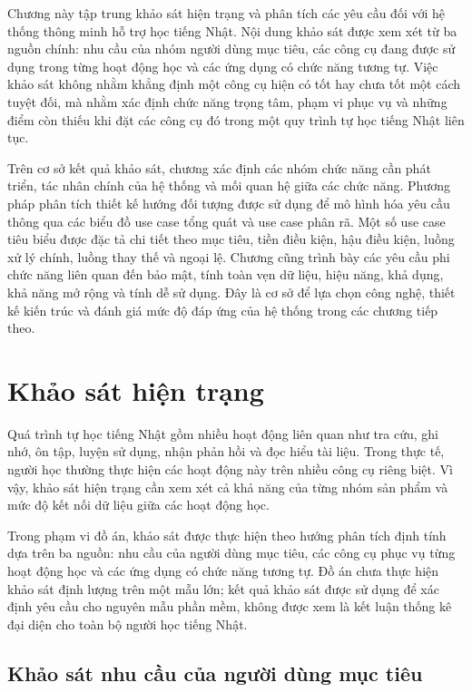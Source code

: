 \documentclass[../DoAn.tex]{subfiles}
\begin{document}
Chương này tập trung khảo sát hiện trạng và phân tích các yêu cầu đối với hệ thống thông minh hỗ trợ học tiếng Nhật. Nội dung khảo sát được xem xét từ ba nguồn chính: nhu cầu của nhóm người dùng mục tiêu, các công cụ đang được sử dụng trong từng hoạt động học và các ứng dụng có chức năng tương tự. Việc khảo sát không nhằm khẳng định một công cụ hiện có tốt hay chưa tốt một cách tuyệt đối, mà nhằm xác định chức năng trọng tâm, phạm vi phục vụ và những điểm còn thiếu khi đặt các công cụ đó trong một quy trình tự học tiếng Nhật liên tục.

Trên cơ sở kết quả khảo sát, chương xác định các nhóm chức năng cần phát triển, tác nhân chính của hệ thống và mối quan hệ giữa các chức năng. Phương pháp phân tích thiết kế hướng đối tượng được sử dụng để mô hình hóa yêu cầu thông qua các biểu đồ use case tổng quát và use case phân rã. Một số use case tiêu biểu được đặc tả chi tiết theo mục tiêu, tiền điều kiện, hậu điều kiện, luồng xử lý chính, luồng thay thế và ngoại lệ. Chương cũng trình bày các yêu cầu phi chức năng liên quan đến bảo mật, tính toàn vẹn dữ liệu, hiệu năng, khả dụng, khả năng mở rộng và tính dễ sử dụng. Đây là cơ sở để lựa chọn công nghệ, thiết kế kiến trúc và đánh giá mức độ đáp ứng của hệ thống trong các chương tiếp theo.

\section{Khảo sát hiện trạng}
\label{section:2.1}

Quá trình tự học tiếng Nhật gồm nhiều hoạt động liên quan như tra cứu, ghi nhớ, ôn tập, luyện sử dụng, nhận phản hồi và đọc hiểu tài liệu. Trong thực tế, người học thường thực hiện các hoạt động này trên nhiều công cụ riêng biệt. Vì vậy, khảo sát hiện trạng cần xem xét cả khả năng của từng nhóm sản phẩm và mức độ kết nối dữ liệu giữa các hoạt động học.

Trong phạm vi đồ án, khảo sát được thực hiện theo hướng phân tích định tính dựa trên ba nguồn: nhu cầu của người dùng mục tiêu, các công cụ phục vụ từng hoạt động học và các ứng dụng có chức năng tương tự. Đồ án chưa thực hiện khảo sát định lượng trên một mẫu lớn; kết quả khảo sát được sử dụng để xác định yêu cầu cho nguyên mẫu phần mềm, không được xem là kết luận thống kê đại diện cho toàn bộ người học tiếng Nhật.

\subsection{Khảo sát nhu cầu của người dùng mục tiêu}
\label{subsection:2.1.1}
\end{document}
